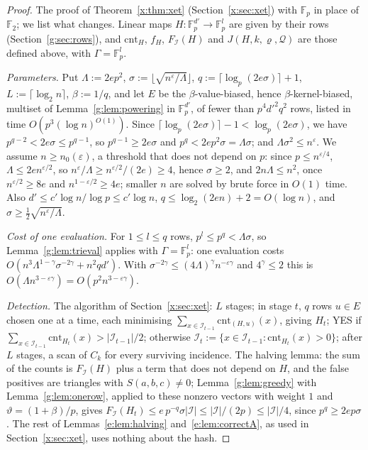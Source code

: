 \documentclass[11pt]{article}
\theoremstyle{definition}
\theoremstyle{remark}
\newcommand{\F}{\mathbb{F}_2}
\newcommand{\Fp}{\mathbb{F}_p}
\newcommand{\eps}{\varepsilon}
\newcommand{\cnt}{\mathrm{cnt}}
\newcommand{\Iq}{\mathcal{I}}
\begin{document}
\begin{proof}
The proof of Theorem~\ref{x:thm:xet} (Section~\ref{x:sec:xet}) with $\Fp$ in place of $\F$; we list what changes. Linear maps $H\colon\Fp^{d'}\to\Fp^l$ are given by their rows (Section~\ref{g:sec:rows}), and $\cnt_H$, $f_H$, $F_\Iq(H)$ and $J(H,k,\varrho,\mathcal Q)$ are those defined above, with $\Gamma=\Fp^l$.

\emph{Parameters.} Put $\Lambda:=2ep^2$, $\sigma:=\lfloor\sqrt{n^\eps/\Lambda}\rfloor$, $q:=\lceil\log_p(2e\sigma)\rceil+1$, $L:=\lceil\log_2n\rceil$, $\beta:=1/q$, and let $E$ be the $\beta$-value-biased, hence $\beta$-kernel-biased, multiset of Lemma~\ref{g:lem:powering} in $\Fp^{d'}$, of fewer than $p^4d'^2q^2$ rows, listed in time $O(p^3(\log n)^{O(1)})$. Since $\lceil\log_p(2e\sigma)\rceil-1<\log_p(2e\sigma)$, we have $p^{q-2}<2e\sigma\le p^{q-1}$, so $p^{q-1}\ge2e\sigma$ and $p^q<2ep^2\sigma=\Lambda\sigma$; and $\Lambda\sigma^2\le n^\eps$. We assume $n\ge n_0(\eps)$, a threshold that does not depend on $p$: since $p\le n^{\eps/4}$, $\Lambda\le2en^{\eps/2}$, so $n^\eps/\Lambda\ge n^{\eps/2}/(2e)\ge4$, hence $\sigma\ge2$, and $2n\Lambda\le n^2$, once $n^{\eps/2}\ge8e$ and $n^{1-\eps/2}\ge4e$; smaller $n$ are solved by brute force in $O(1)$ time. Also $d'\le c'\log n/\log p\le c'\log n$, $q\le\log_2(2en)+2=O(\log n)$, and $\sigma\ge\frac12\sqrt{n^\eps/\Lambda}$.

\emph{Cost of one evaluation.} For $1\le l\le q$ rows, $p^l\le p^q<\Lambda\sigma$, so Lemma~\ref{g:lem:trieval} applies with $\Gamma=\Fp^l$: one evaluation costs $O(n^3\Lambda^{1-\gamma}\sigma^{-2\gamma}+n^2qd')$. With $\sigma^{-2\gamma}\le(4\Lambda)^\gamma n^{-\eps\gamma}$ and $4^\gamma\le2$ this is $O(\Lambda n^{3-\eps\gamma})=O(p^2n^{3-\eps\gamma})$.

\emph{Detection.} The algorithm of Section~\ref{x:sec:xet}: $L$ stages; in stage $t$, $q$ rows $u\in E$ chosen one at a time, each minimising $\sum_{x\in\Iq_{t-1}}\cnt_{(H,u)}(x)$, giving $H_t$; YES if $\sum_{x\in\Iq_{t-1}}\cnt_{H_t}(x)>|\Iq_{t-1}|/2$; otherwise $\Iq_t:=\{x\in\Iq_{t-1}:\cnt_{H_t}(x)>0\}$; after $L$ stages, a scan of $C_k$ for every surviving incidence. The halving lemma: the sum of the counts is $F_\Iq(H)$ plus a term that does not depend on $H$, and the false positives are triangles with $S(a,b,c)\ne0$; Lemma~\ref{g:lem:greedy} with Lemma~\ref{g:lem:onerow}, applied to these nonzero vectors with weight $1$ and $\vartheta=(1+\beta)/p$, gives $F_\Iq(H_t)\le e\,p^{-q}\sigma|\Iq|\le|\Iq|/(2p)\le|\Iq|/4$, since $p^q\ge2ep\sigma$. The rest of Lemmas~\ref{e:lem:halving} and~\ref{e:lem:correctA}, as used in Section~\ref{x:sec:xet}, uses nothing about the hash.


\end{proof}
\end{document}

